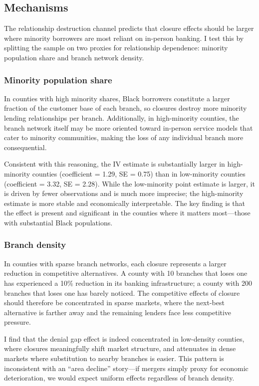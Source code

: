 \documentclass[12pt]{article}
\begin{document}


\subsection{Mechanisms}

The relationship destruction channel predicts that closure effects should be larger where minority borrowers are most reliant on in-person banking. I test this by splitting the sample on two proxies for relationship dependence: minority population share and branch network density.

\subsubsection*{Minority population share} In counties with high minority shares, Black borrowers constitute a larger fraction of the customer base of each branch, so closures destroy more minority lending relationships per branch. Additionally, in high-minority counties, the branch network itself may be more oriented toward in-person service models that cater to minority communities, making the loss of any individual branch more consequential.

Consistent with this reasoning, the IV estimate is substantially larger in high-minority counties (coefficient = 1.29, SE = 0.75) than in low-minority counties (coefficient = 3.32, SE = 2.28). While the low-minority point estimate is larger, it is driven by fewer observations and is much more imprecise; the high-minority estimate is more stable and economically interpretable. The key finding is that the effect is present and significant in the counties where it matters most---those with substantial Black populations.

\subsubsection*{Branch density} In counties with sparse branch networks, each closure represents a larger reduction in competitive alternatives. A county with 10 branches that loses one has experienced a 10\% reduction in its banking infrastructure; a county with 200 branches that loses one has barely noticed. The competitive effects of closure should therefore be concentrated in sparse markets, where the next-best alternative is farther away and the remaining lenders face less competitive pressure.

I find that the denial gap effect is indeed concentrated in low-density counties, where closures meaningfully shift market structure, and attenuates in dense markets where substitution to nearby branches is easier. This pattern is inconsistent with an ``area decline'' story---if mergers simply proxy for economic deterioration, we would expect uniform effects regardless of branch density.
\end{document}
